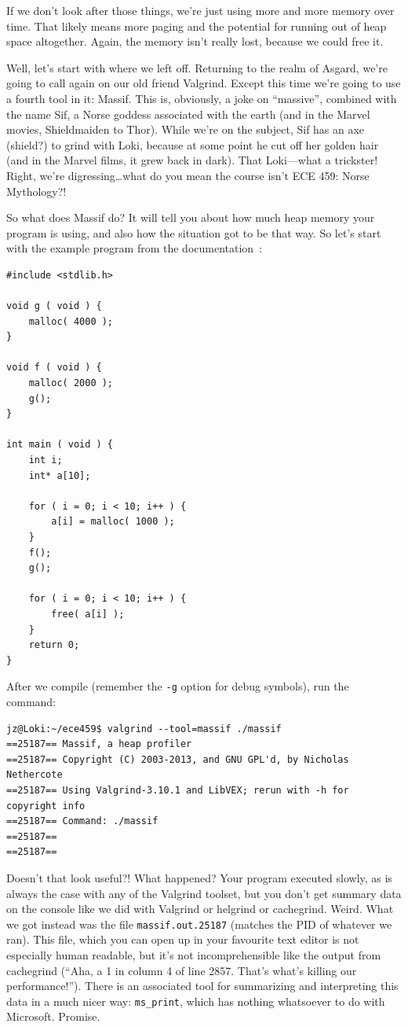 \documentclass[a4paper]{report}
\begin{document}
If we don't look after those things, we're just using more and more memory over time. That likely means more paging and the potential for running out of heap space altogether. Again, the memory isn't really lost, because we could free it.

Well, let's start with where we left off. Returning to the realm of Asgard, we're going to call again on our old friend Valgrind. Except this time we're going to use a fourth tool in it: Massif. This is, obviously, a joke on ``massive'', combined with the name Sif, a Norse goddess associated with the earth (and in the Marvel movies, Shieldmaiden to Thor). While we're on the subject, Sif has an axe (shield?) to grind with Loki, because at some point he cut off her golden hair (and in the Marvel films, it grew back in dark). That Loki---what a trickster! Right, we're digressing\ldots what do you mean the course isn't ECE 459: Norse Mythology?!

So what does Massif do? It will tell you about how much heap memory your program is using, and also how the situation got to be that way. So let's start with the example program from the documentation~\cite{massif}:

{\scriptsize
\begin{verbatim}
#include <stdlib.h>

void g ( void ) {
    malloc( 4000 );
}

void f ( void ) {
    malloc( 2000 );
    g();
}

int main ( void ) {
    int i;
    int* a[10];

    for ( i = 0; i < 10; i++ ) {
        a[i] = malloc( 1000 );
    }
    f();
    g();

    for ( i = 0; i < 10; i++ ) {
        free( a[i] );
    }
    return 0;
}
\end{verbatim}
}

After we compile (remember the \texttt{-g} option for debug symbols), run the command:
{\scriptsize
\begin{verbatim}
jz@Loki:~/ece459$ valgrind --tool=massif ./massif
==25187== Massif, a heap profiler
==25187== Copyright (C) 2003-2013, and GNU GPL'd, by Nicholas Nethercote
==25187== Using Valgrind-3.10.1 and LibVEX; rerun with -h for copyright info
==25187== Command: ./massif
==25187== 
==25187== 
\end{verbatim}
}

Doesn't that look useful?! What happened? Your program executed slowly, as is always the case with any of the Valgrind toolset, but you don't get summary data on the console like we did with Valgrind or helgrind or cachegrind. Weird. What we got instead was the file \texttt{massif.out.25187} (matches the PID of whatever we ran). This file, which you can open up in your favourite text editor is not especially human readable, but it's not incomprehensible like the output from cachegrind (``Aha, a 1 in column 4 of line 2857. That's what's killing our performance!''). There is an associated tool for summarizing and interpreting this data in a much nicer way: \texttt{ms\_print}, which has nothing whatsoever to do with Microsoft. Promise.
\end{document}
